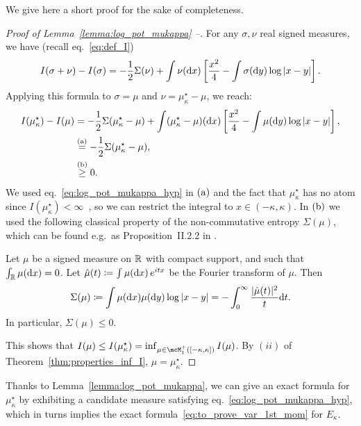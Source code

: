 {We give here a short proof for the sake of completeness.
\begin{proof}[Proof of Lemma~\ref{lemma:log_pot_mukappa} --]
    For any $\sigma, \nu$ real signed measures, we have (recall eq.~\eqref{eq:def_I}) 
    \begin{equation*}
        I(\sigma + \nu) - I(\sigma) = -\frac{1}{2} \Sigma(\nu) + \int \nu(\mathrm{d} x) \left[\frac{x^2}{4} - \int \sigma(\mathrm{d} y) \log |x - y|\right]. 
    \end{equation*}
    Applying this formula to $\sigma = \mu$ and $\nu = \mu_\kappa^\star - \mu$, we reach:
    \begin{align*}
        I(\mu_\kappa^\star) - I(\mu) &= -\frac{1}{2} \Sigma(\mu_\kappa^\star - \mu) + \int (\mu_\kappa^\star - \mu)(\mathrm{d} x) \left[\frac{x^2}{4} - \int \mu(\mathrm{d} y) \log |x - y|\right], \\ 
         &\overset{\mathrm{(a)}}{=} -\frac{1}{2} \Sigma(\mu_\kappa^\star - \mu), \\ 
         &\overset{\mathrm{(b)}}{\geq} 0.
    \end{align*}
    We used eq.~\eqref{eq:log_pot_mukappa_hyp} in $(\rm a)$ and the fact that $\mu_\kappa^\star$ has no atom since $I(\mu_\kappa^\star) < \infty$~\citep{arous1997large}, so we can restrict the integral 
    to $x \in (-\kappa,\kappa)$.
    In $(\rm b)$ we used the following classical property of the non-commutative entropy $\Sigma(\mu)$, 
    which can be found e.g.\ as Proposition~II.2.2 in \cite{faraut2014logarithmic}.
    \begin{lemma}\label{lemma:nonc_entropy_pos}
        Let $\mu$ be a signed measure on $\mathbb{R}$ with compact support, and such that $\int_{\mathbb{R}} \mu(\mathrm{d} x) = 0$. 
        Let $\hat{\mu}(t) \coloneqq \int \mu(\mathrm{d} x) \, e^{i t x}$ be the Fourier transform of $\mu$.
        Then 
        \begin{equation*}
            \Sigma(\mu) \coloneqq \int \mu(\mathrm{d} x) \mu(\mathrm{d} y) \log |x - y| = - \int_0^\infty \frac{|\hat{\mu}(t)|^2}{t} \mathrm{d} t.
        \end{equation*}
        In particular, $\Sigma(\mu) \leq 0$.
    \end{lemma}
    \noindent
    This shows that $I(\mu) \leq I(\mu_\kappa^\star) = \inf_{\mu \in \mcM_1^+([-\kappa,\kappa])} I(\mu)$. By $(ii)$ of Theorem~\ref{thm:properties_inf_I}, $\mu = \mu_\kappa^\star$.
\end{proof}
\noindent
Thanks to Lemma~\ref{lemma:log_pot_mukappa}, we can give an exact formula for $\mu_\kappa^\star$ by exhibiting a candidate measure satisfying eq.~\eqref{eq:log_pot_mukappa_hyp}, which in turns implies the exact formula~\eqref{eq:to_prove_var_1st_mom} for $E_\kappa$.
}
